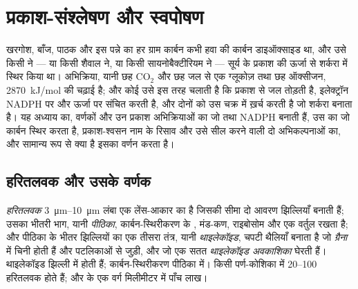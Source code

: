 \chapter{प्रकाश-संश्लेषण और स्वपोषण}\label{ch:b1:photosynthesis}

खरगोश, बाँज, पाठक और इस पन्ने का हर ग्राम कार्बन कभी हवा की कार्बन
डाइऑक्साइड था, और उसे किसी  ने --- या किसी शैवाल ने, या किसी
सायनोबैक्टीरियम ने --- सूर्य के प्रकाश की ऊर्जा से शर्करा में स्थिर किया
था। अभिक्रिया, यानी छह $\mathrm{CO_2}$ और छह जल से एक ग्लूकोज़ तथा छह
ऑक्सीजन, \qty{2870}{kJ/mol} की चढ़ाई है; और कोई  उसे इस तरह चलाती
है कि प्रकाश से जल तोड़ती है, इलेक्ट्रॉन NADPH पर और ऊर्जा  पर संचित
करती है, और दोनों को उस चक्र में ख़र्च करती है जो शर्करा बनाता है। यह
अध्याय  का, वर्णकों और उन प्रकाश अभिक्रियाओं का जो  तथा NADPH
बनाती हैं, उस  का जो कार्बन स्थिर करता है, प्रकाश-श्वसन नाम
के रिसाव और उसे सील करने वाली दो अभिकल्पनाओं का, और सामान्य रूप से
 क्या है इसका वर्णन करता है।

\section{हरितलवक और उसके वर्णक}

\begin{definition}[हरितलवक]\label{def:b1:photosynthesis:chloroplast}
\emph{हरितलवक} \qtyrange{3}{10}{\micro m} लंबा एक
लेंस-आकार का  है जिसकी सीमा दो आवरण झिल्लियाँ बनाती हैं; उसका
भीतरी भाग, यानी \emph{पीठिका}, कार्बन-स्थिरीकरण के ,
मंड-कण, राइबोसोम और एक वर्तुल  रखता है; और पीठिका के भीतर झिल्लियों का
एक तीसरा तंत्र, यानी \emph{थाइलेकॉइड}, चपटी थैलियाँ
बनाता है जो \emph{ग्रैना} में चिनी होती हैं और पटलिकाओं से जुड़ी, और जो
एक सतत \emph{थाइलेकॉइड अवकाशिका} घेरती हैं। 
थाइलेकॉइड झिल्ली में होती हैं; कार्बन-स्थिरीकरण पीठिका में। किसी
पर्ण-कोशिका में \qtyrange{20}{100}{} हरितलवक होते हैं; और  के एक वर्ग
मिलीमीटर में पाँच लाख।
\end{definition}

